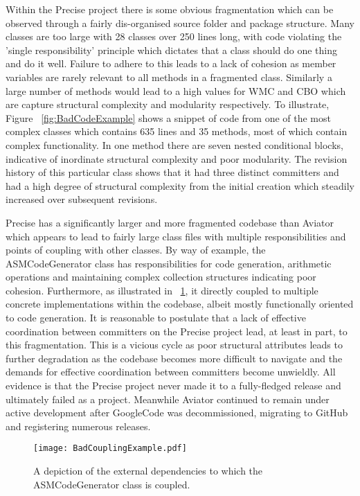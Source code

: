 Within the Precise project there is some obvious fragmentation which can be observed through a fairly dis-organised source folder and package structure. Many classes are too large with 28 classes over 250 lines long, with code violating the 'single responsibility' principle which dictates that a class should do one thing and do it well. Failure to adhere to this leads to a lack of cohesion as member variables are rarely relevant to all methods in a fragmented class. Similarly a large number of methods would lead to a high values for WMC and CBO which are capture structural complexity and modularity respectively. To illustrate, Figure ~\ref{fig:BadCodeExample} shows a snippet of code from one of the most complex classes which contains 635 lines and 35 methods, most of which contain complex functionality. In one method there are seven nested conditional blocks, indicative of inordinate structural complexity and poor modularity. The revision history of this particular class shows that it had three distinct committers and had a high degree of structural complexity from the initial creation which steadily increased over subsequent revisions.
 
Precise has a significantly larger and more fragmented codebase than Aviator which appears to lead to fairly large class files with multiple responsibilities and points of coupling with other classes. By way of example, the ASMCodeGenerator class has responsibilities for code generation, arithmetic operations and maintaining complex collection structures indicating poor cohesion. Furthermore, as illustrated in ~\ref{fig:BadCouplingExample}, it directly coupled to multiple concrete implementations within the codebase, albeit mostly functionally oriented to code generation.  It is reasonable to postulate that a lack of effective coordination between committers on the Precise project lead, at least in part, to this fragmentation. This is a vicious cycle as poor structural attributes leads to further degradation as the codebase becomes more difficult to navigate and the demands for effective coordination between committers become unwieldly. All evidence is that the Precise project never made it to a fully-fledged release and ultimately failed as a project. Meanwhile Aviator continued to remain under active development after GoogleCode was decommissioned, migrating to GitHub and registering numerous releases.

\begin{figure}[htbp!] 
\centering    
\texttt{[image: BadCouplingExample.pdf]}
\caption{A depiction of the external dependencies to which the ASMCodeGenerator class is coupled.}
\label{fig:BadCouplingExample}
\end{figure}


